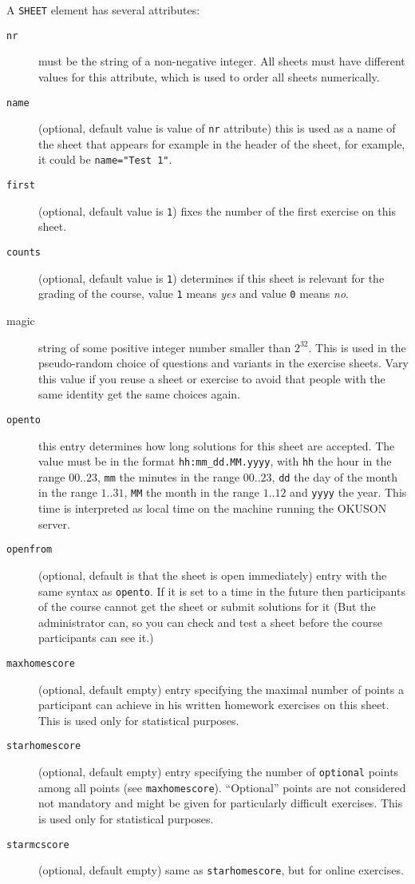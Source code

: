 \documentclass[12pt,openany,a4paper]{book}
\newcommand{\OKUSON}{\textsf{OKUSON}}
\begin{document}
A \texttt{SHEET} element has several attributes:
\begin{description}
\item[\texttt{nr}] must be the string of a non-negative integer. All sheets
must have different values for this attribute, which is used to order
all sheets numerically. 
\item[\texttt{name}] (optional, default value is value of \texttt{nr}
attribute) this is used as a name of the sheet that appears for example in
the header of the sheet, for example, it could be \texttt{name="Test 1"}.
\item[\texttt{first}] (optional, default value is \texttt{1}) fixes the
number of the first exercise on this sheet.
\item[\texttt{counts}] (optional, default value is \texttt{1}) determines if
this sheet is relevant for the grading of the course, value
\texttt{1} means \emph{yes} and value \texttt{0} means \emph{no}. 
\item[magic] string of some positive integer number smaller than $2^{32}$. This
is used in the pseudo-random choice of questions and variants in the
exercise sheets. Vary this value if you reuse a sheet or exercise to avoid
that people with the same identity get the same choices again.
\item[\texttt{opento}] this entry determines how long solutions for this
sheet are accepted. The value must be in the format \verb+hh:mm_dd.MM.yyyy+,
with \texttt{hh} the hour in the range $00..23$, \texttt{mm} the minutes in
the range $00..23$, \texttt{dd} the day of the month in the range $1..31$,
\texttt{MM} the month in the range $1..12$ and \texttt{yyyy} the year. This
time is interpreted as local time on the machine running the {\OKUSON}
server.
\item[\texttt{openfrom}] (optional, default is that the sheet is open
immediately) entry with the same syntax as
\texttt{opento}. If it is set to a time in the future then participants of
the course cannot get the sheet or submit solutions for it (But the
administrator can, so you can check and test a sheet before the course
participants can see it.) 
\item[\texttt{maxhomescore}] (optional, default empty) entry specifying the 
maximal number of points a participant can achieve in his written homework
exercises on this sheet. This is used only for statistical purposes.
\item[\texttt{starhomescore}] (optional, default empty) entry specifying the
number of \texttt{optional} points among all points (see \texttt{maxhomescore}).
``Optional'' points are not considered not mandatory and might be given
for particularly difficult exercises. This is used only for statistical
purposes.
\item[\texttt{starmcscore}] (optional, default empty) 
same as \texttt{starhomescore}, but for online exercises.
\end{description}
\end{document}
